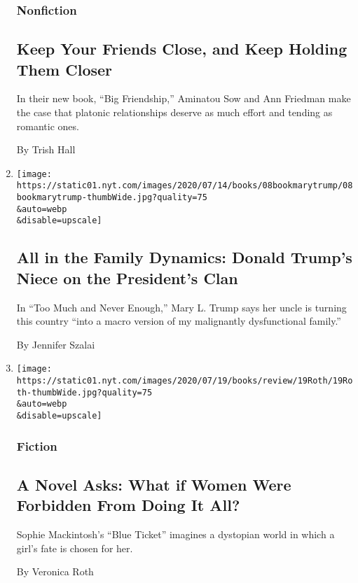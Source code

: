 \begin{enumerate}
  \hypertarget{nonfiction-3}{%
  \subsubsection{Nonfiction}\label{nonfiction-3}}

  \hypertarget{keep-your-friends-close-and-keep-holding-them-closer}{%
  \subsection{Keep Your Friends Close, and Keep Holding Them
  Closer}\label{keep-your-friends-close-and-keep-holding-them-closer}}

  In their new book, ``Big Friendship,'' Aminatou Sow and Ann Friedman
  make the case that platonic relationships deserve as much effort and
  tending as romantic ones.

  By Trish Hall
\item
  \href{/2020/07/08/books/review-too-much-never-enough-mary-trump.html}{}

  \texttt{[image: https://static01.nyt.com/images/2020/07/14/books/08bookmarytrump/08bookmarytrump-thumbWide.jpg?quality=75\\\&auto=webp\\\&disable=upscale]}

  \hypertarget{all-in-the-family-dynamics-donald-trumps-niece-on-the-presidents-clan}{%
  \subsection{All in the Family Dynamics: Donald Trump's Niece on the
  President's
  Clan}\label{all-in-the-family-dynamics-donald-trumps-niece-on-the-presidents-clan}}

  In ``Too Much and Never Enough,'' Mary L. Trump says her uncle is
  turning this country ``into a macro version of my malignantly
  dysfunctional family.''

  By Jennifer Szalai
\item
  \href{/2020/06/30/books/review/blue-ticket-sophie-mackintosh.html}{}

  \texttt{[image: https://static01.nyt.com/images/2020/07/19/books/review/19Roth/19Roth-thumbWide.jpg?quality=75\\\&auto=webp\\\&disable=upscale]}

  \hypertarget{fiction-2}{%
  \subsubsection{Fiction}\label{fiction-2}}

  \hypertarget{a-novel-asks-what-if-women-were-forbidden-from-doing-it-all}{%
  \subsection{A Novel Asks: What if Women Were Forbidden From Doing It
  All?}\label{a-novel-asks-what-if-women-were-forbidden-from-doing-it-all}}

  Sophie Mackintosh's ``Blue Ticket'' imagines a dystopian world in
  which a girl's fate is chosen for her.

  By Veronica Roth
\end{enumerate}

